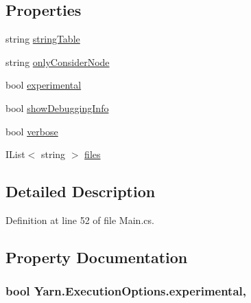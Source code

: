 \subsection*{Properties}
\begin{DoxyCompactItemize}
\item 
string \hyperlink{a00097_a7e43c3b73722956cb0f5d507e4eef527}{string\-Table}
\item 
string \hyperlink{a00097_af4c0062a1d46281d377f87084fde374e}{only\-Consider\-Node}
\item 
bool \hyperlink{a00097_ad97950e47ce2aaeb598295b7c3c44b13}{experimental}
\item 
bool \hyperlink{a00035_a89964ea17bd19caf00cb5bff563ed01c}{show\-Debugging\-Info}
\item 
bool \hyperlink{a00035_ada4d83d1756918f362d55f6649b82b17}{verbose}
\item 
I\-List$<$ string $>$ \hyperlink{a00035_aa93cbb1bc1d5328e0a417012621e92d2}{files}
\end{DoxyCompactItemize}


\subsection{Detailed Description}


Definition at line 52 of file Main.\-cs.



\subsection{Property Documentation}
\hypertarget{a00097_ad97950e47ce2aaeb598295b7c3c44b13}{
\subsubsection[{experimental}]{\setlength{\rightskip}{0pt plus 5cm}bool Yarn.\-Execution\-Options.\-experimental\hspace{0.3cm}{\ttfamily [get]}, {\ttfamily [set]}}}\label{a00097_ad97950e47ce2aaeb598295b7c3c44b13}


